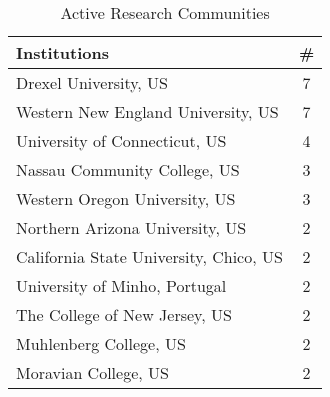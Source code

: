 \begin{table}[htb]
\caption{Active Research Communities}
{\begin{tabular}{p{3in}|c}
\textbf{Institutions} & \textbf{\#} \\ \hline
Drexel University, US & 7 \\
Western New England University, US & 7 \\
University of Connecticut, US & 4 \\
Nassau Community College, US & 3\\
Western Oregon University,  US & 3\\
Northern Arizona University, US & 2\\
California State University, Chico, US & 2\\
University of Minho, Portugal & 2\\
The College of New Jersey, US & 2\\
Muhlenberg College, US & 2\\
Moravian College, US & 2
\end{tabular}}
\label{tab:communities}
\end{table}

